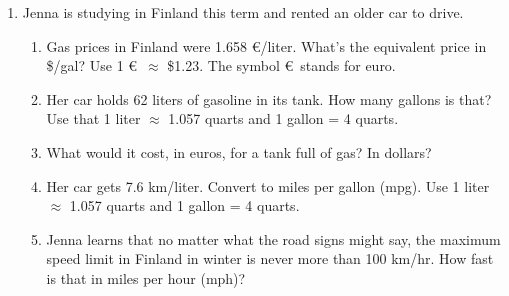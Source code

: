 \begin{enumerate}
\item Jenna is studying in Finland this term and rented an older car to drive.
\begin{enumerate}
\item Gas prices in Finland were 1.658 \euro/liter.  What's the equivalent price in \$/gal?  Use 1 \euro~$\approx$ \$1.23.  The symbol \euro~stands for euro. \vfill
\item  Her car holds 62 liters of gasoline in its tank.  How many gallons is that?  Use that 1 liter $\approx$ 1.057 quarts and 1 gallon = 4 quarts.\vfill
\item What would it cost, in euros, for a tank full of gas?  In dollars? \vfill
\item Her car gets 7.6 km/liter.  Convert to miles per gallon (mpg).  Use 1 liter $\approx$ 1.057 quarts and 1 gallon = 4 quarts.\vfill
\item Jenna learns that no matter what the road signs might say, the maximum speed limit in Finland in winter is never more than 100 km/hr.  How fast is that in miles per hour (mph)?\vfill
\end{enumerate}

\end{enumerate}

